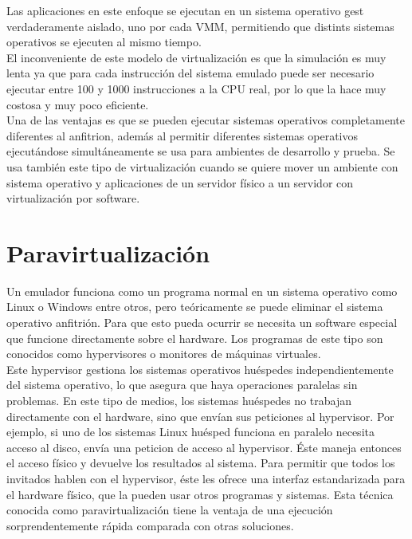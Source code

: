 \documentclass[10pt,a4paper,spanish]{report}
\begin{document}
  \noindent
  Las aplicaciones en este enfoque se ejecutan en un sistema operativo gest verdaderamente aislado, uno por cada VMM, permitiendo que distints sistemas operativos se ejecuten al mismo tiempo.\\

  \noindent
  El inconveniente de este modelo de virtualización es que la simulación es muy lenta ya que para cada instrucción del sistema emulado puede ser necesario ejecutar entre 100 y 1000 instrucciones a la CPU real, por lo que la hace muy costosa y muy poco eficiente. \\

  \noindent
  Una de las ventajas es que se pueden ejecutar sistemas operativos completamente diferentes al anfitrion, además al permitir diferentes sistemas operativos ejecutándose simultáneamente se usa para ambientes de desarrollo y prueba. Se usa también este tipo de virtualización cuando se quiere mover un ambiente con sistema operativo y aplicaciones de un servidor físico a un servidor con virtualización por software.

  \newpage
  \section{Paravirtualización}

  \noindent
  Un emulador funciona como un programa normal en un sistema operativo como Linux o Windows entre otros, pero teóricamente se puede eliminar el sistema operativo anfitrión. Para que esto pueda ocurrir se necesita un software especial que funcione directamente sobre el hardware. Los programas de este tipo son conocidos como hypervisores o monitores de máquinas virtuales.\\

  \noindent
  Este hypervisor gestiona los sistemas operativos huéspedes independientemente del sistema operativo, lo que asegura que haya operaciones paralelas sin problemas. En este tipo de medios, los sistemas huéspedes no trabajan directamente con el hardware, sino que envían sus peticiones al hypervisor. Por ejemplo, si uno de los sistemas Linux huésped funciona en paralelo necesita acceso al disco, envía una peticion de acceso al hypervisor. Éste maneja entonces el acceso físico y devuelve los resultados al sistema. Para permitir que todos los invitados hablen con el hypervisor, éste les ofrece una interfaz estandarizada para el hardware físico, que la pueden usar otros programas y sistemas. Esta técnica conocida como paravirtualización tiene la ventaja de una ejecución sorprendentemente rápida comparada con otras soluciones.\\
\end{document}
